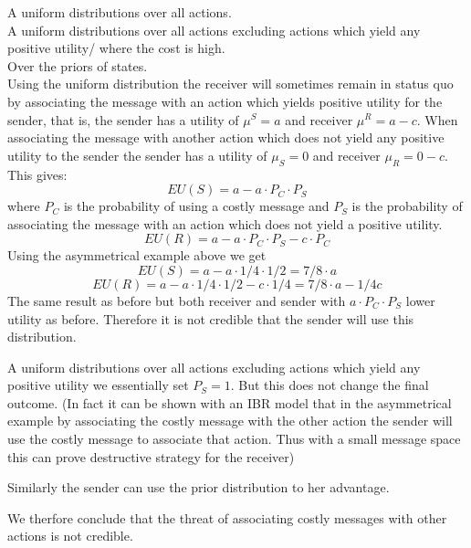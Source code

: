\documentclass[10]{article}
\begin{document}
A uniform distributions over all actions. \\
A uniform distributions over all actions excluding actions which yield any positive utility/ where the cost is high. \\%
Over the priors of states. \\

Using the uniform distribution the receiver will sometimes remain in status quo by associating the message with an action which yields positive utility for the sender, that is, the sender has a utility of $\mu^S=a$ and receiver $\mu^R=a-c$. When associating the message with another action which does not yield any positive utility to the sender the sender has a utility of $\mu_S=0$ and receiver $\mu_R=0-c$. %
This gives:
$$EU(S)=a-a \cdot P_C \cdot P_S$$
 where $P_C$ is the probability of using a costly message and $P_S$ is the probability of associating the message with an action which does not yield a positive utility.
 $$EU(R)=a-a \cdot P_C \cdot P_S - c \cdot P_C$$
 Using the asymmetrical example above we get
 $$EU(S)=a-a \cdot 1/4 \cdot 1/2=7/8 \cdot a$$
 $$EU(R)=a-a \cdot 1/4 \cdot 1/2 - c \cdot 1/4=7/8 \cdot a - 1/4c$$
 The same result as before but both receiver and sender with $a \cdot P_C \cdot P_S$ lower utility as before. Therefore it is not credible that the sender will use this distribution.

A uniform distributions over all actions excluding actions which yield any positive utility we essentially set $P_S=1$. But this does not change the final outcome. (In fact it can be shown with an IBR model that in the asymmetrical example by associating the costly message with the other action the sender will use the costly message to associate that action. Thus with a small message space this can prove destructive strategy for the receiver)

Similarly the sender can use the prior distribution to her advantage.

We therfore conclude that the threat of associating costly messages with other actions is not credible.
\end{document}
